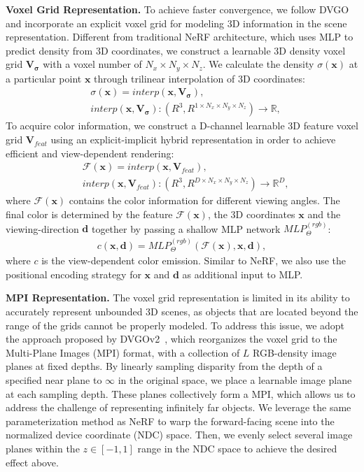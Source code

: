 \documentclass[letterpaper, 10 pt, conference]{ieeeconf}  %
\begin{document}
\noindent
{\bf Voxel Grid Representation.}
To achieve faster convergence, we follow DVGO~\cite{sun2021direct} and incorporate an explicit voxel grid for modeling 3D information in the scene representation. Different from traditional NeRF architecture, which uses MLP to predict density from 3D coordinates, we construct a learnable 3D density voxel grid $\mathbf{V_\sigma}$ with a voxel number of $N_x\times N_y\times N_z$. We calculate the density $\sigma(\mathbf{x})$ at a particular point $\mathbf{x}$ through trilinear interpolation of 3D coordinates:
\begin{align}
    & \sigma(\mathbf{x})=interp(\mathbf{x}, \mathbf{V_\sigma}), \\
    & interp(\mathbf{x}, \mathbf{V_\sigma}):(R^3, R^{1\times N_x\times N_y\times N_z})\to \mathbb{R},
\end{align}
To acquire color information, we construct a D-channel learnable 3D feature voxel grid $\mathbf{V}_{feat}$ using an explicit-implicit hybrid representation in order to achieve efficient and view-dependent rendering:
\begin{align}
    & \mathcal{F}(\mathbf{x}) =interp(\mathbf{x}, \mathbf{V}_{feat}), \\
    & interp(\mathbf{x}, \mathbf{V}_{feat}) :(R^3, R^{D\times N_x\times N_y\times N_z})\to \mathbb{R}^D,
\end{align}
where $\mathcal{F}(\mathbf{x}) $ contains the color information for different viewing angles. The final color is determined by the feature $\mathcal{F}(\mathbf{x})$, the 3D coordinates $\mathbf{x}$ and the viewing-direction $\mathbf{d}$ together by passing a shallow MLP network $MLP^{(rgb)}_\Theta$:
\begin{align}
    c(\mathbf{x},\mathbf{d}) = MLP^{(rgb)}_\Theta(\mathcal{F}(\mathbf{x}),\mathbf{x}, \mathbf{d}),
\end{align}
where $c$ is the view-dependent color emission. Similar to NeRF, we also use the positional encoding strategy for $\mathbf{x}$ and $\mathbf{d}$ as additional input to MLP.

\noindent
{\bf MPI Representation.}
The voxel grid representation is limited in its ability to accurately represent unbounded 3D scenes, as objects that are located beyond the range of the grids cannot be properly modeled. To address this issue, we adopt the approach proposed by DVGOv2~\cite{sun2022improved}, which reorganizes the voxel grid to the Multi-Plane Images (MPI) format, with a collection of $L$ RGB-density image planes at fixed depths. By linearly sampling disparity from the depth of a specified near plane to $\infty$ in the original space, we place a learnable image plane at each sampling depth. These planes collectively form a MPI, which allows us to address the challenge of representing infinitely far objects. We leverage the same parameterization method as NeRF to warp the forward-facing scene into the normalized device coordinate (NDC) space. Then, we evenly select several image planes within the $z\in[-1,1]$ range in the NDC space to achieve the desired effect above.
\end{document}

